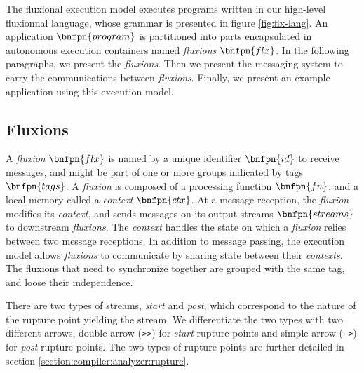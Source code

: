 The fluxional execution model executes programs written in our high-level fluxionnal language, whose grammar is presented in figure \ref{fig:flx-lang}.
An application $\bnfpn{program}$ is partitioned into parts encapsulated in autonomous execution containers named \textit{fluxions} $\bnfpn{flx}$.
In the following paragraphs, we present the \textit{fluxions}.
Then we present the messaging system to carry the communications between \textit{fluxions}.
Finally, we present an example application using this execution model.

\subsection{Fluxions}

A \textit{fluxion} $\bnfpn{flx}$ is named by a unique identifier $\bnfpn{id}$ to receive messages, and might be part of one or more groups indicated by tags $\bnfpn{tags}$.
A \textit{fluxion} is composed of a processing function $\bnfpn{fn}$, and a local memory called a \textit{context} $\bnfpn{ctx}$.
At a message reception, the \textit{fluxion} modifies its \textit{context}, and sends messages on its output streams $\bnfpn{streams}$ to downstream \textit{fluxions}.
The \textit{context} handles the state on which a \textit{fluxion} relies between two message receptions.
In addition to message passing, the execution model allows \textit{fluxions} to communicate by sharing state between their \textit{contexts}.
The fluxions that need to synchronize together are grouped with the same tag, and loose their independence.

There are two types of streams, \textit{start} and \textit{post}, which correspond to the nature of the rupture point yielding the stream.
We differentiate the two types with two different arrows, double arrow (\texttt{>>}) for \textit{start} rupture points and simple arrow (\texttt{->}) for \textit{post} rupture points.
The two types of rupture points are further detailed in section \ref{section:compiler:analyzer:rupture}.


